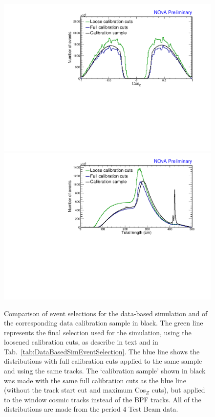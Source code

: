 \begin{figure}[!h]
\includegraphics[clip, width=\textwidth]{Plots/TBCalibration/DBSim_SelectionComparisonPCHitsListCut_CosZ.pdf}
\includegraphics[clip, width=\textwidth]{Plots/TBCalibration/DBSim_SelectionComparisonPCHitsListCut_TotLength.pdf}
\caption[Event selection for the data-based simulation]{Comparison of event selections for the data-based simulation and of the corresponding data calibration sample in black. The green line represents the final selection used for the simulation, using the loosened calibration cuts, as describe in text and in Tab.~\ref{tab:DataBasedSimEventSelection}. The blue line shows the distributions with full calibration cuts applied to the same sample and using the same tracks. The `calibration sample' shown in black was made with the same full calibration cuts as the blue line (without the track start cut and maximum Cos$_Z$ cuts), but applied to the window cosmic tracks instead of the \acrshort{BPF} tracks. All of the distributions are made from the period 4 Test Beam data.}
\label{figPCHitsListCutsComparison}
\end{figure}

